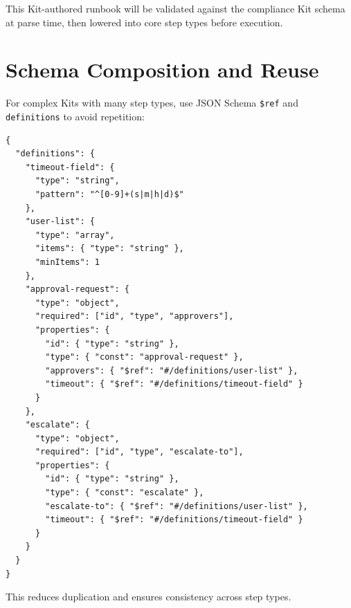 This Kit-authored runbook will be validated against the compliance Kit schema
at parse time, then lowered into core step types before execution.

\section{Schema Composition and Reuse}
\label{sec:schema-composition}

For complex Kits with many step types, use JSON Schema \texttt{\$ref} and
\texttt{definitions} to avoid repetition:

\begin{verbatim}
{
  "definitions": {
    "timeout-field": {
      "type": "string",
      "pattern": "^[0-9]+(s|m|h|d)$"
    },
    "user-list": {
      "type": "array",
      "items": { "type": "string" },
      "minItems": 1
    },
    "approval-request": {
      "type": "object",
      "required": ["id", "type", "approvers"],
      "properties": {
        "id": { "type": "string" },
        "type": { "const": "approval-request" },
        "approvers": { "$ref": "#/definitions/user-list" },
        "timeout": { "$ref": "#/definitions/timeout-field" }
      }
    },
    "escalate": {
      "type": "object",
      "required": ["id", "type", "escalate-to"],
      "properties": {
        "id": { "type": "string" },
        "type": { "const": "escalate" },
        "escalate-to": { "$ref": "#/definitions/user-list" },
        "timeout": { "$ref": "#/definitions/timeout-field" }
      }
    }
  }
}
\end{verbatim}

This reduces duplication and ensures consistency across step types.
